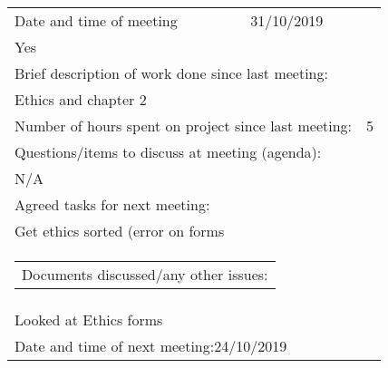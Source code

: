  \\
\smallskip
\\
\begin{tabularx}{\textwidth}{|X|X|X|}
     
\hline
Date and time of meeting                         &          31/10/2019               & \begin{tabular}[c]{@{}l@{}}As scheduled:  \\ Yes\end{tabular} \\ \hline
\multicolumn{3}{|l|}{Brief description of work done since last meeting:}                                                                      \\ \hline
\multicolumn{3}{|l|}{Ethics and chapter 2}                                                                                                                     \\ \hline
\multicolumn{2}{|l|}{Number of hours spent on project since last meeting:} &  5               \\ \hline
\multicolumn{3}{|l|}{Questions/items to discuss at meeting (agenda):}         \\ \hline

\multicolumn{3}{|l|}{N/A}     \\ \hline
\multicolumn{3}{|l|}{Agreed tasks for next meeting: }     \\ \hline
\multicolumn{3}{|l|}{Get ethics sorted (error on forms}                                                                                                                     \\ \hline
\multicolumn{3}{|l|}{\begin{tabular}[c]{@{}l@{}}Documents discussed/any other issues:\end{tabular}}                                        \\ \hline
\multicolumn{3}{|l|}{Looked at Ethics forms}                                             
\\ \hline
\multicolumn{3}{|l|}{Date and time of next meeting:24/10/2019}                       \\ \hline
\end{tabularx}
